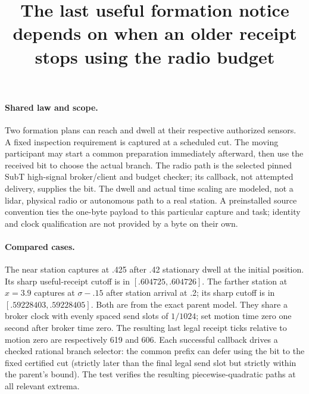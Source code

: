 \documentclass{article}
\begin{document}
\title{The last useful formation notice depends on when an older receipt stops using the radio budget}
\maketitle

\paragraph{Shared law and scope.}
Two formation plans can reach and dwell at their respective authorized
sensors. A fixed inspection requirement is captured at a scheduled cut.
The moving participant may start a common preparation immediately
afterward, then use the received bit to choose the actual branch.
The radio path is the selected pinned SubT high-signal broker/client
and budget checker; its callback, not attempted delivery, supplies the
bit. The dwell and actual time scaling are modeled, not a lidar,
physical radio or autonomous path to a real station. A preinstalled
source convention ties the one-byte payload to this particular
capture and task; identity and clock qualification are not provided
by a byte on their own.

\paragraph{Compared cases.}
The near station captures at .425 after .42 stationary dwell at the
initial position. Its sharp useful-receipt cutoff is in
$[.604725,.604726]$. The farther station at $x=3.9$ captures
at $\sigma-.15$ after station arrival at .2; its sharp cutoff is
in $[.59228403,.59228405]$. Both are from the exact parent model.
They share a broker clock with evenly spaced send slots of $1/1024$;
set motion time zero one second after broker time zero. The resulting
last legal receipt ticks relative to motion zero are respectively 619
and 606. Each successful callback drives a checked rational branch
selector: the common prefix can defer using the bit to the fixed
certified cut (strictly later than the final legal send slot but
strictly within the parent's bound). The test verifies the resulting
piecewise-quadratic paths at all relevant extrema.
\end{document}
